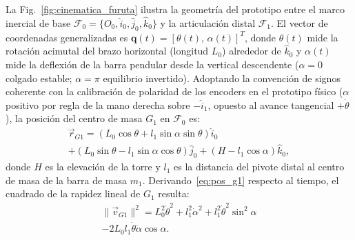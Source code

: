 

La \mbox{Fig.~\ref{fig:cinematica_furuta}} ilustra la geometría del prototipo entre el marco inercial de base $\mathcal{F}_0=\{O_0,\hat{i}_0,\hat{j}_0,\hat{k}_0\}$ y la articulación distal $\mathcal{F}_1$. El vector de coordenadas generalizadas es $\mathbf{q}(t)=[\theta(t),\,\alpha(t)]^T$, donde $\theta(t)$ mide la rotación acimutal del brazo horizontal (longitud $L_0$) alrededor de $\hat{k}_0$ y $\alpha(t)$ mide la deflexión de la barra pendular desde la vertical descendente ($\alpha=0$ colgado estable; $\alpha=\pi$ equilibrio invertido). Adoptando la convención de signos coherente con la calibración de polaridad de los encoders en el prototipo físico ($\alpha$ positivo por regla de la mano derecha sobre $-\hat{i}_1$, opuesto al avance tangencial $+\dot{\theta}$), la posición del centro de masa $G_1$ en $\mathcal{F}_0$ es:
\begin{multline}
    \vec{r}_{G1} = \left(L_0\cos\theta + l_1\sin\alpha\sin\theta\right)\hat{i}_0 \\
    + \left(L_0\sin\theta - l_1\sin\alpha\cos\theta\right)\hat{j}_0 + \left(H - l_1\cos\alpha\right)\hat{k}_0,
    \label{eq:pos_g1}
\end{multline}
donde $H$ es la elevación de la torre y $l_1$ es la distancia del pivote distal al centro de masa de la barra de masa $m_1$. Derivando~\eqref{eq:pos_g1} respecto al tiempo, el cuadrado de la rapidez lineal de $G_1$ resulta:
\begin{multline}
    \|\vec{v}_{G1}\|^2 = L_0^2\dot{\theta}^2 + l_1^2\dot{\alpha}^2 + l_1^2\dot{\theta}^2\sin^2\alpha \\
    - 2 L_0 l_1 \dot{\theta}\dot{\alpha}\cos\alpha.
    \label{eq:v_g1_cuadrado}
\end{multline}

